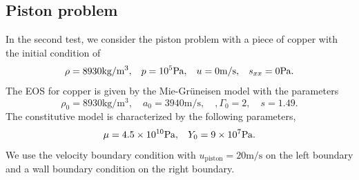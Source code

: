 \documentclass[review]{elsarticle}
\begin{document}
\subsection{Piston problem}
In the second test, we consider the  piston problem \cite{maire2007cell} with a piece of copper with the initial condition of
\begin{equation}
  \rho = 8930 \text{kg}/\text{m}^3, \hspace{0.3cm}  p = 10^5 \text{Pa}, \hspace{0.3cm}  u = 0 \text{m}/\text{s},\hspace{0.3cm}  s_{xx} = 0 \text{Pa}.
\end{equation}
The EOS for copper is given by  the Mie-Gr\"uneisen model with the parameters
\begin{equation}
  \rho_0 = 8930 \text{kg}/\text{m}^3, \quad a_0 = 3940\text{m}/\text{s}, \quad , \Gamma_0 = 2, \quad  s = 1.49.
\end{equation}
The constitutive model is characterized by the following parameters,
\begin{equation}
  \mu = 4.5\times 10^{10}\text{Pa}, \hspace{0.3cm} Y_0 = 9\times 10^7 \text{Pa}.
\end{equation}
We use the velocity boundary condition with $u_{\text{piston}} = 20 \text{m}/\text{s}$ on the left boundary  and a  wall boundary condition on the right boundary.
\end{document}
